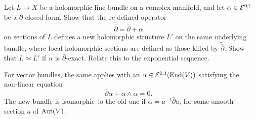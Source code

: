 \documentclass[12pt]{article}
\begin{document}
\begin{exercise}
Let $L\to X$ be a holomorphic line bundle on a complex manifold, and let
$\alpha\in{\mathcal{E}}^{0,1}$ be a $\bar\partial$-closed form. Show that the
re-defined operator
\[
\tilde{\bar\partial} = \bar\partial + \alpha
\]
on sections of $L$ defines a new holomorphic structure $L'$ on the same
underlying bundle, where local holomorphic sections are defined as those
killed by $\tilde{\bar\partial}$. Show that $L\simeq L'$ if $\alpha$ is
$\bar\partial$-exact. Relate this to the exponential sequence.
\end{exercise}

For vector bundles, the same applies with an
$\alpha\in{\mathcal{E}}^{0,1}(\operatorname{End}(V))$ satisfying the non-linear equation
\[
\bar\partial\alpha + \alpha\wedge\alpha = 0.
\]
The new bundle is isomorphic to the old one if
$\alpha = a^{-1}\bar\partial a$, for some smooth section $a$ of $\operatorname{Aut}(V)$.
\end{document}
